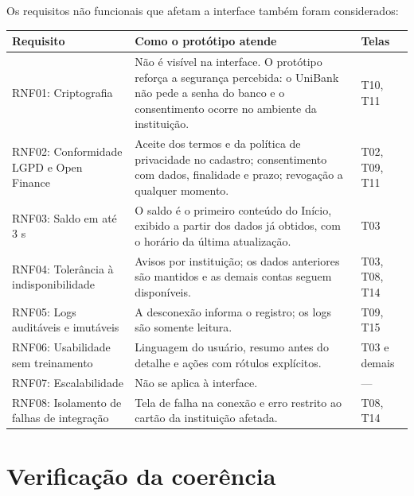 \documentclass[11pt,a4paper]{article}
\newcommand{\hd}[1]{\cellcolor{headfill}\textbf{#1}}
\begin{document}
Os requisitos não funcionais que afetam a interface também foram considerados:

\begingroup\small
\begin{xltabular}{\linewidth}{|L{3.6cm}|Y|L{2.2cm}|}
\hline
\hd{Requisito} & \hd{Como o protótipo atende} & \hd{Telas} \\ \hline
\endhead
RNF01: Criptografia & Não é visível na interface. O protótipo reforça a segurança percebida: o UniBank não pede a senha do banco e o consentimento ocorre no ambiente da instituição. & T10, T11 \\ \hline
RNF02: Conformidade LGPD e Open Finance & Aceite dos termos e da política de privacidade no cadastro; consentimento com dados, finalidade e prazo; revogação a qualquer momento. & T02, T09, T11 \\ \hline
RNF03: Saldo em até 3 s & O saldo é o primeiro conteúdo do Início, exibido a partir dos dados já obtidos, com o horário da última atualização. & T03 \\ \hline
RNF04: Tolerância à indisponibilidade & Avisos por instituição; os dados anteriores são mantidos e as demais contas seguem disponíveis. & T03, T08, T14 \\ \hline
RNF05: Logs auditáveis e imutáveis & A desconexão informa o registro; os logs são somente leitura. & T09, T15 \\ \hline
RNF06: Usabilidade sem treinamento & Linguagem do usuário, resumo antes do detalhe e ações com rótulos explícitos. & T03 e demais \\ \hline
RNF07: Escalabilidade & Não se aplica à interface. & — \\ \hline
RNF08: Isolamento de falhas de integração & Tela de falha na conexão e erro restrito ao cartão da instituição afetada. & T08, T14 \\ \hline
\end{xltabular}
\endgroup

\section{Verificação da coerência}
\end{document}
